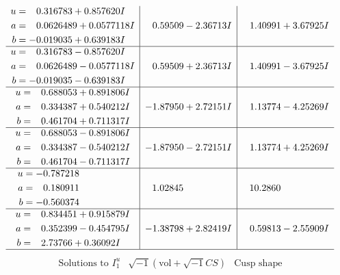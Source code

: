 \documentclass[1p]{elsarticle_modified}
\theoremstyle{definition}
\newcommand{\I}{\sqrt{-1}}
\begin{document}
$$\begin{array}{c|c|c}
\begin{aligned}
u &= \phantom{-}0.316783 + 0.857620 I \\
a &= \phantom{-}0.0626489 + 0.0577118 I \\
b &= -0.019035 + 0.639183 I\end{aligned}
 & \phantom{-}0.59509 - 2.36713 I & \phantom{-}1.40991 + 3.67925 I \\ \hline\begin{aligned}
u &= \phantom{-}0.316783 - 0.857620 I \\
a &= \phantom{-}0.0626489 - 0.0577118 I \\
b &= -0.019035 - 0.639183 I\end{aligned}
 & \phantom{-}0.59509 + 2.36713 I & \phantom{-}1.40991 - 3.67925 I \\ \hline\begin{aligned}
u &= \phantom{-}0.688053 + 0.891806 I \\
a &= \phantom{-}0.334387 + 0.540212 I \\
b &= \phantom{-}0.461704 + 0.711317 I\end{aligned}
 & -1.87950 + 2.72151 I & \phantom{-}1.13774 - 4.25269 I \\ \hline\begin{aligned}
u &= \phantom{-}0.688053 - 0.891806 I \\
a &= \phantom{-}0.334387 - 0.540212 I \\
b &= \phantom{-}0.461704 - 0.711317 I\end{aligned}
 & -1.87950 - 2.72151 I & \phantom{-}1.13774 + 4.25269 I \\ \hline\begin{aligned}
u &= -0.787218\phantom{ +0.000000I} \\
a &= \phantom{-}0.180911\phantom{ +0.000000I} \\
b &= -0.560374\phantom{ +0.000000I}\end{aligned}
 & \phantom{-}1.02845\phantom{ +0.000000I} & \phantom{-}10.2860\phantom{ +0.000000I} \\ \hline\begin{aligned}
u &= \phantom{-}0.834451 + 0.915879 I \\
a &= \phantom{-}0.352399 - 0.454795 I \\
b &= \phantom{-}2.73766 + 0.36092 I\end{aligned}
 & -1.38798 + 2.82419 I & \phantom{-}0.59813 - 2.55909 I\\
 \hline 
 \end{array}$$\newpage$$\begin{array}{c|c|c}  
\text{Solutions to }I^u_{1}& \I (\text{vol} + \sqrt{-1}CS) & \text{Cusp shape}\\

\end{array}$$
\end{document}
